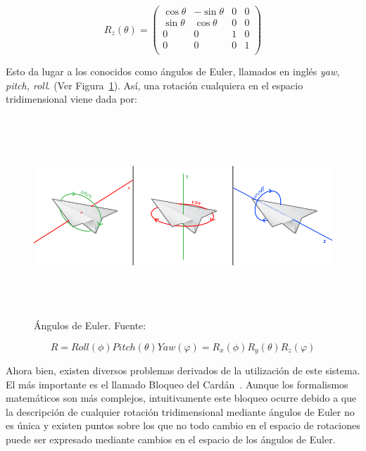 \begin{equation}
	R_z(\theta) =
	\left(	
		\begin{array}{cccc}
			\cos{\theta} & -\sin{\theta} & 0 & 0 \\				
			\sin{\theta} & \cos{\theta} & 0 & 0 \\				
			0 & 0 & 1 & 0\\				
			0 & 0 & 0 & 1 \\				
		\end{array}
	\right)
\end{equation} 

Esto da lugar a los conocidos como ángulos de Euler, llamados en inglés
\textit{yaw, pitch, roll}. (Ver Figura~\ref{fig:eulerangles}). Así, una rotación
cualquiera en el espacio tridimensional viene dada por:

\begin{figure}
	\centering
	\includegraphics[height=7.5cm,width=\textwidth]{figures/eulerangles.png}
	\caption[Ángulos de Euler.]{Ángulos de Euler. Fuente:~\citet{LearnOpenGL}}
	\label{fig:eulerangles}
\end{figure}

\begin{equation}
		R = Roll(\phi)Pitch(\theta)Yaw(\varphi) = R_x(\phi)R_y(\theta)R_z(\varphi)	
\end{equation}

Ahora bien, existen diversos problemas derivados de la utilización de este
sistema. El más importante es el llamado Bloqueo del
Cardán~\cite{Vince:2011:QCG:2016678}. Aunque los formalismos matemáticos son más
complejos, intuitivamente este bloqueo ocurre debido a que la descripción de
cualquier rotación tridimensional mediante ángulos de Euler no es única y
existen puntos sobre los que no todo cambio en el espacio de rotaciones puede
ser expresado mediante cambios en el espacio de los ángulos de Euler. 


